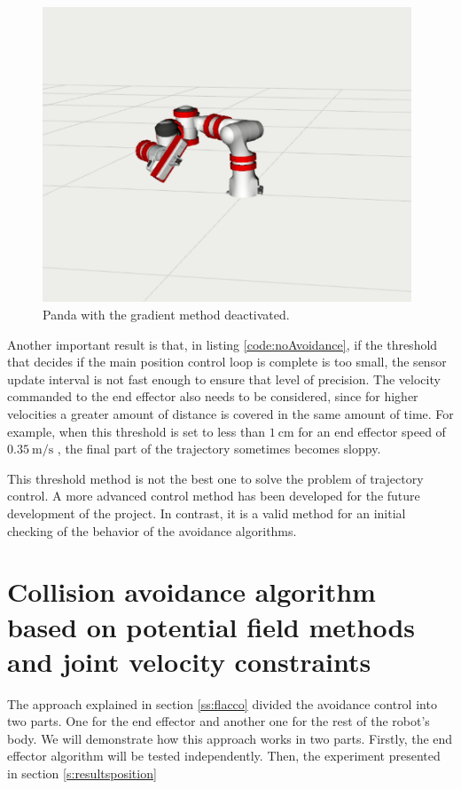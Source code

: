 \begin{figure}[H]
    \caption[pandafloor]{
    Panda with the gradient method deactivated.
    }
    \begin{center}
    \includegraphics[width=110mm]{figs/pandafloor.png}
    \end{center}
\label{fig:pandafloor}
\end{figure}

Another important result is that, in listing \ref{code:noAvoidance}, if the threshold that decides if the main position control loop is complete is too small, the sensor update interval is not fast enough to ensure that level of precision. The velocity commanded to the end effector also needs to be considered, since for higher velocities a greater amount of distance is covered in the same amount of time. For example, when this threshold is set to less than $\SI{1}{\centi \metre}$ for an end effector speed of $\SI{0.35}{\metre/\second}$ , the final part of the trajectory sometimes becomes sloppy.

This threshold method is not the best one to solve the problem of trajectory control. A more advanced control method has been developed for the future development of the project. In contrast, it is a valid method for an initial checking of the behavior of the avoidance algorithms.

\section{Collision avoidance algorithm based on potential field methods and joint velocity constraints}

The approach explained in section \ref{ss:flacco} divided the avoidance control into two parts. One for the end effector and another one for the rest of the robot's body. We will demonstrate how this approach works in two parts. Firstly, the end effector algorithm will be tested independently. Then, the experiment presented in section \ref{s:resultsposition}

